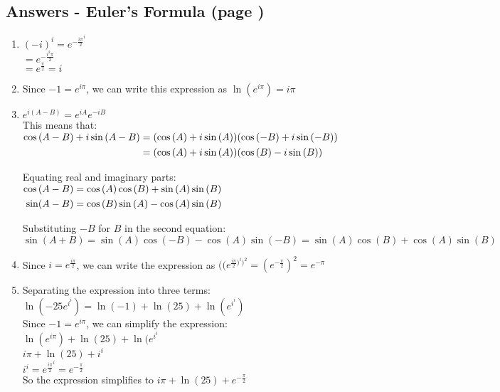\documentclass[../main.tex]{subfiles}
\begin{document}
\subsection*{Answers - Euler's Formula (page \pageref{eulersformula})}

\begin{spacing}{1.5}
\begin{enumerate}
    \item 
    \((-i)^i=e^{-\frac{i\pi}{2}^{i}}\)\\
    \(=e^{-\frac{i^2 \pi}{2}}\)\\
    \(=e^{\frac{\pi}{2}}=i\)

    \item 
    Since \(-1=e^{i \pi}\), we can write this expression as \(\ln{(e^{i \pi})}=i \pi\)\\

    \item 
    \(e^{i(A-B)}=e^{iA}e^{-iB}\)\\
    This means that:\\
    $
    \!
    \begin{aligned}[t]
    \cos{(A-B)+i\sin{(A-B)}}
    &=(\cos{(A)+i\sin{(A)}})(\cos{(-B)+i\sin{(-B)}})\\
    &=(\cos{(A)+i\sin{(A)}})(\cos{(B)-i\sin{(B)}})
    \end{aligned}\\
    $
    
    Equating real and imaginary parts:\\
    $
    \!
    \begin{aligned}[t]
    \cos{(A-B)}
    &=\cos{(A)}\cos{(B)}+\sin{(A)}\sin{(B)}\\
    \sin(A-B)
    &=\cos{(B)}\sin{(A)}-\cos{(A)}\sin{(B)}\\
    \end{aligned}\\
    $

    Substituting \(-B\) for \(B\) in the second equation:\\
    \(\sin{(A+B)}=\sin{(A)}\cos{(-B)}-\cos{(A)}\sin{(-B)}=\sin{(A)}\cos{(B)}+\cos{(A)}\sin{(B)}\)\\

    \item 
    Since \(i=e^{\frac{i \pi}{2}}\), we can write the expression as \(((e^{\frac{i \pi}{2})^i)^2}=(e^{-\frac{\pi}{2}})^2=e^{-\pi}\)\\

    \item 
    Separating the expression into three terms:\\
    \(\ln{(-25e^{i^{i}})}=\ln(-1)+\ln(25)+\ln(e^{i^{i}})\)\\
    Since \(-1=e^{i \pi}\), we can simplify the expression:\\
    \(\ln(e^{i \pi})+\ln(25)+\ln(e^{i^{i}}\)\\
    \(i \pi + \ln(25) + i^i\)\\

    \(i^i=e^{\frac{i \pi}{2}^{i}}=e^{-\frac{\pi}{2}}\)\\
    So the expression simplifies to \(i \pi + \ln(25) + e^{-\frac{\pi}{2}}\)\\
    
\end{enumerate}
\end{spacing}
\end{document}
